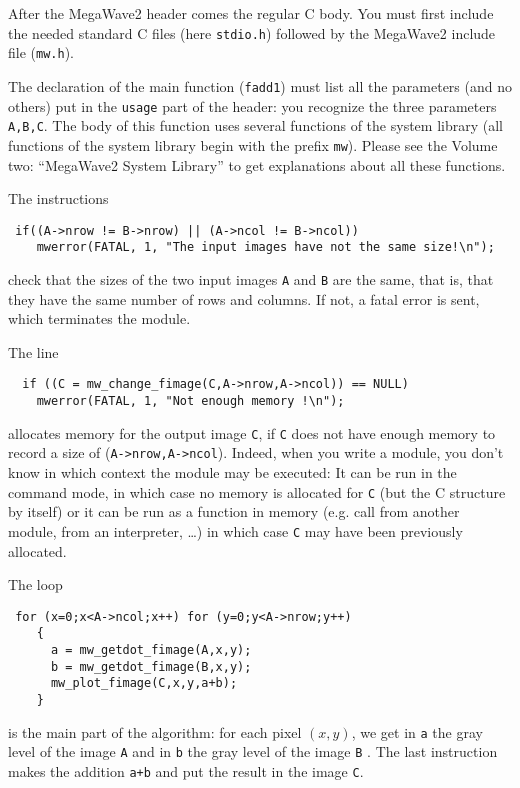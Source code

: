After the MegaWave2 header comes the regular C body.
You must first include the needed standard C files (here \verb+stdio.h+)
followed by the MegaWave2 include file (\verb+mw.h+).

The declaration of the main function (\verb+fadd1+) must list all the parameters (and no others) put in the \verb+usage+ part of the header:
you recognize the three parameters \verb+A,B,C+.
The body of this function uses several functions of the system library (all functions of the system library begin with the prefix \verb+mw+).
Please see the Volume two: ``MegaWave2 System Library'' to get explanations about all these functions.

The instructions
\begin{verbatim}
 if((A->nrow != B->nrow) || (A->ncol != B->ncol))
    mwerror(FATAL, 1, "The input images have not the same size!\n");
\end{verbatim}
check that the sizes of the two input images \verb+A+ and \verb+B+ are the same,
that is, that they have the same number of rows and columns.
If not, a fatal error is sent, which terminates the module.

The line
\begin{verbatim}
  if ((C = mw_change_fimage(C,A->nrow,A->ncol)) == NULL)
    mwerror(FATAL, 1, "Not enough memory !\n");  
\end{verbatim}
allocates memory for the output image \verb+C+, if \verb+C+ does not have enough
memory to record a size of (\verb+A->nrow,A->ncol+).
Indeed, when you write a module, you don't know in which context the module may be executed:
It can be run in the command mode, in which case no memory is allocated for \verb+C+ (but the C structure by itself) or it can be run as a function in memory
(e.g. call from another module, from an interpreter, \ldots) in which case 
\verb+C+ may have been previously allocated.

The loop
\begin{verbatim}
 for (x=0;x<A->ncol;x++) for (y=0;y<A->nrow;y++)
    {
      a = mw_getdot_fimage(A,x,y);
      b = mw_getdot_fimage(B,x,y);
      mw_plot_fimage(C,x,y,a+b);
    }
\end{verbatim}
is the main part of the algorithm: 
for each pixel $(x,y)$, we get in \verb+a+ the gray level of the image \verb+A+
and in \verb+b+ the gray level of the image \verb+B+
.
The last instruction makes the addition \verb-a+b- and put the result in the
image \verb+C+.

